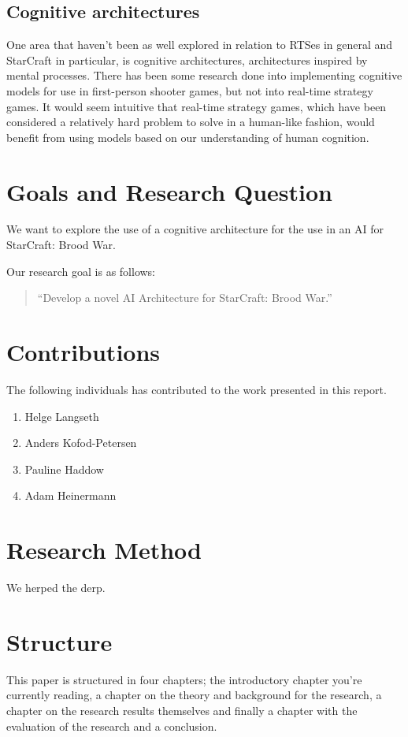 \subsection{Cognitive architectures}
One area that haven't been as well explored in relation to RTSes in general and
StarCraft in particular, is cognitive architectures, architectures inspired by
mental processes. There has been some research done into implementing cognitive
models for use in first-person shooter games, but not into real-time strategy
games. It would seem intuitive that real-time strategy games, which have been
considered a relatively hard problem to solve in a human-like fashion, would
benefit from using models based on our understanding of human cognition.


\section{Goals and Research Question}
We want to explore the use of a cognitive architecture for the use in an AI for
StarCraft: Brood War.

Our research goal is as follows:
\begin{quote}
 ``Develop a novel AI Architecture for StarCraft: Brood War.''
\end{quote}


\section{Contributions}
The following individuals has contributed to the work presented in this report.

\begin{enumerate}
 \item Helge Langseth
 \item Anders Kofod-Petersen
 \item Pauline Haddow
 \item Adam Heinermann
\end{enumerate}


\section{Research Method}
We herped the derp.


\section{Structure}
This paper is structured in four chapters; the introductory chapter you're
currently reading, a chapter on the theory and background for the research, a
chapter on the research results themselves and finally a chapter with the
evaluation of the research and a conclusion.